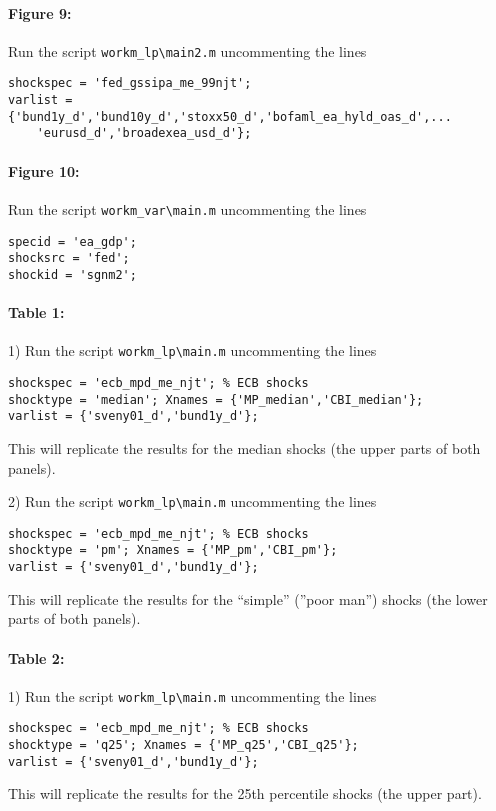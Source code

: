 \documentclass[12pt]{article}
\begin{document}
\paragraph{Figure 9:} Run the script
\verb|workm_lp\main2.m| uncommenting the lines
\begin{verbatim}
shockspec = 'fed_gssipa_me_99njt';
varlist = {'bund1y_d','bund10y_d','stoxx50_d','bofaml_ea_hyld_oas_d',...
    'eurusd_d','broadexea_usd_d'};
\end{verbatim}

\paragraph{Figure 10:} Run the script
\verb|workm_var\main.m| uncommenting the lines
\begin{verbatim}
specid = 'ea_gdp';
shocksrc = 'fed';
shockid = 'sgnm2';
\end{verbatim}

\paragraph{Table 1:} 1) Run the script
\verb|workm_lp\main.m| uncommenting the lines
\begin{verbatim}
shockspec = 'ecb_mpd_me_njt'; % ECB shocks
shocktype = 'median'; Xnames = {'MP_median','CBI_median'};
varlist = {'sveny01_d','bund1y_d'};
\end{verbatim}
This will replicate the results for the median shocks (the upper parts of both panels).

2) Run the script
\verb|workm_lp\main.m| uncommenting the lines
\begin{verbatim}
shockspec = 'ecb_mpd_me_njt'; % ECB shocks
shocktype = 'pm'; Xnames = {'MP_pm','CBI_pm'};
varlist = {'sveny01_d','bund1y_d'};
\end{verbatim}
This will replicate the results for the ``simple'' (''poor man'') shocks (the lower parts of both panels).

\paragraph{Table 2:} 1) Run the script
\verb|workm_lp\main.m| uncommenting the lines
\begin{verbatim}
shockspec = 'ecb_mpd_me_njt'; % ECB shocks
shocktype = 'q25'; Xnames = {'MP_q25','CBI_q25'};
varlist = {'sveny01_d','bund1y_d'};
\end{verbatim}
This will replicate the results for the 25th percentile shocks (the upper part).
\end{document}
